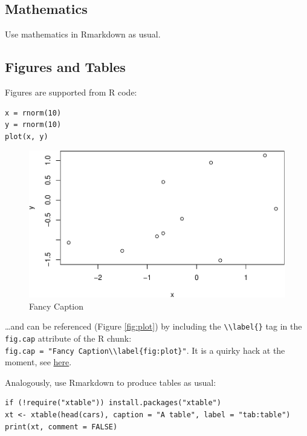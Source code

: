 \documentclass[Royal,times,sageh]{sagej}
\begin{document}
\hypertarget{mathematics}{%
\subsection{Mathematics}\label{mathematics}}

Use mathematics in Rmarkdown as usual.

\hypertarget{figures-and-tables}{%
\subsection{Figures and Tables}\label{figures-and-tables}}

Figures are supported from R code:

\begin{verbatim}
x = rnorm(10)
y = rnorm(10)
plot(x, y)
\end{verbatim}

\begin{figure}
\includegraphics[width=1\linewidth]{article_template_sage_article_files/figure-latex/plot-ref-1} \caption{Fancy Caption\label{fig:plot}}\label{fig:plot-ref}
\end{figure}

\ldots{}and can be referenced (Figure \ref{fig:plot}) by including the
\texttt{\textbackslash{}\textbackslash{}label\{\}} tag in the
\texttt{fig.cap} attribute of the R chunk:
\texttt{fig.cap\ =\ "Fancy\ Caption\textbackslash{}\textbackslash{}label\{fig:plot\}"}.
It is a quirky hack at the moment, see
\href{https://github.com/yihui/knitr/issues/323}{here}.

Analogously, use Rmarkdown to produce tables as usual:

\begin{verbatim}
if (!require("xtable")) install.packages("xtable")
xt <- xtable(head(cars), caption = "A table", label = "tab:table")
print(xt, comment = FALSE)
\end{verbatim}
\end{document}
